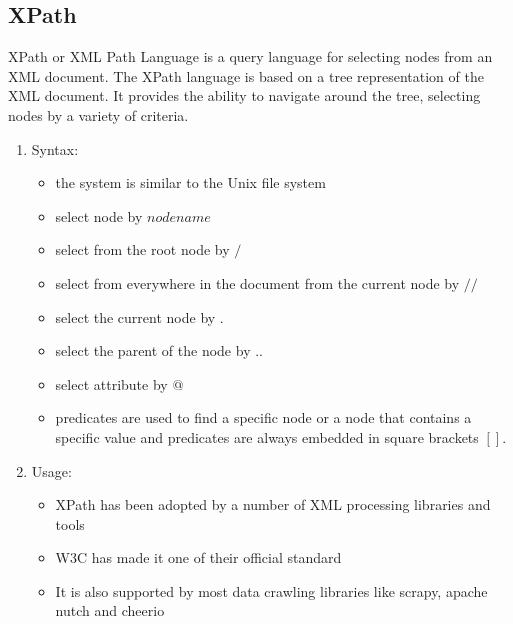\documentclass[11pt,a4paper]{report}
\begin{document}
	\subsection{XPath}
		XPath or XML Path Language is a query language for selecting nodes from an XML document. The XPath language is based on a tree representation of the XML document. It provides the ability to navigate around the tree, selecting nodes by a variety of criteria.
		\begin{enumerate}
			\item Syntax:
			\begin{itemize}
				\item the system is similar to the Unix file system
				\item select node by $nodename$
				\item select from the root node by $/$
				\item select from everywhere in the document from the current node by $//$
				\item select the current node by $.$
				\item select the parent of the node by $..$
				\item select attribute by $@$
				\item predicates are used to find a specific node or a node that contains a specific value and predicates are always embedded in square brackets $[]$.
			\end{itemize}
			\item Usage:
			\begin{itemize}
				\item XPath has been adopted by a number of XML processing libraries and tools
				\item W3C has made it one of their official standard
				\item It is also supported by most data crawling libraries like scrapy, apache nutch and cheerio
			\end{itemize}
		\end{enumerate}
\end{document}
